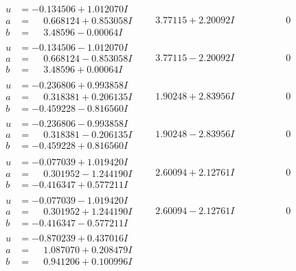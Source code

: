 \documentclass[1p]{elsarticle_modified}
\theoremstyle{definition}
\begin{document}
$$\begin{array}{c|c|c}
\begin{aligned}
u &= -0.134506 + 1.012070 I \\
a &= \phantom{-}0.668124 + 0.853058 I \\
b &= \phantom{-}3.48596 - 0.00064 I\end{aligned}
 & \phantom{-}3.77115 + 2.20092 I & \phantom{-0.000000 } 0 \\ \hline\begin{aligned}
u &= -0.134506 - 1.012070 I \\
a &= \phantom{-}0.668124 - 0.853058 I \\
b &= \phantom{-}3.48596 + 0.00064 I\end{aligned}
 & \phantom{-}3.77115 - 2.20092 I & \phantom{-0.000000 } 0 \\ \hline\begin{aligned}
u &= -0.236806 + 0.993858 I \\
a &= \phantom{-}0.318381 + 0.206135 I \\
b &= -0.459228 - 0.816560 I\end{aligned}
 & \phantom{-}1.90248 + 2.83956 I & \phantom{-0.000000 } 0 \\ \hline\begin{aligned}
u &= -0.236806 - 0.993858 I \\
a &= \phantom{-}0.318381 - 0.206135 I \\
b &= -0.459228 + 0.816560 I\end{aligned}
 & \phantom{-}1.90248 - 2.83956 I & \phantom{-0.000000 } 0 \\ \hline\begin{aligned}
u &= -0.077039 + 1.019420 I \\
a &= \phantom{-}0.301952 - 1.244190 I \\
b &= -0.416347 + 0.577211 I\end{aligned}
 & \phantom{-}2.60094 + 2.12761 I & \phantom{-0.000000 } 0 \\ \hline\begin{aligned}
u &= -0.077039 - 1.019420 I \\
a &= \phantom{-}0.301952 + 1.244190 I \\
b &= -0.416347 - 0.577211 I\end{aligned}
 & \phantom{-}2.60094 - 2.12761 I & \phantom{-0.000000 } 0 \\ \hline\begin{aligned}
u &= -0.870239 + 0.437016 I \\
a &= \phantom{-}1.087070 + 0.208479 I \\
b &= \phantom{-}0.941206 + 0.100996 I\end{aligned}

\end{array}$$
\end{document}
